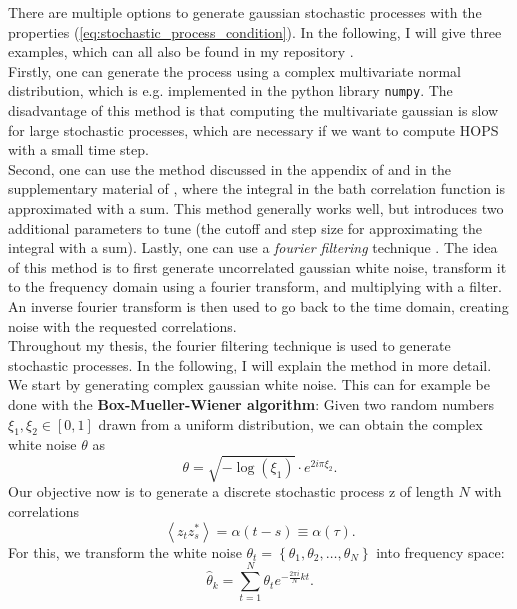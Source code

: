 There are multiple options to generate gaussian stochastic processes with the properties (\ref{eq:stochastic_process_condition}).
In the following, I will give three examples, which can all also be found in my repository \cite{Sappler:2023}. \\
Firstly, one can generate the process using a complex multivariate normal distribution, which is e.g. implemented in
the python library \verb|numpy|. The disadvantage of this method is that computing the multivariate gaussian is slow for
large stochastic processes, which are necessary if we want to compute HOPS with a small time step. \\
Second, one can use the method
discussed in the appendix of \cite{Song:2016} and in the supplementary material of \cite{Gao:2022}, where the integral in the
bath correlation function is approximated with a sum. This method generally works well, but introduces two additional parameters to tune 
(the cutoff and step size for approximating the integral with a sum). 
Lastly, one can use a \textit{fourier filtering} technique \cite{Ojalvo:1994}. The idea of this method is to first generate uncorrelated gaussian
white noise, transform it to the frequency domain using a fourier transform, and multiplying with a filter. An inverse fourier transform is
then used to go back to the time domain, creating noise with the requested correlations. \\
Throughout my thesis, the fourier filtering technique is used to generate stochastic processes. In the following, I will explain
the method in more detail. \\
We start by generating complex gaussian white noise. This can for example be done with the \textbf{Box-Mueller-Wiener algorithm}:
Given two random numbers $\xi_1, \xi_2 \in[0, 1]$ drawn from a uniform distribution, we can obtain the complex white noise $\theta$ as
\begin{equation*}
    \theta = \sqrt{-\log(\xi_1)} \cdot e^{2i\pi\xi_2}.
\end{equation*}
Our objective now is to generate a discrete stochastic process z of length $N$ with correlations
\begin{equation*}
    \left\langle z_t z^*_s\right\rangle = \alpha(t - s) \equiv \alpha(\tau).
\end{equation*}
For this, we transform the white noise $\theta_t = \left\{\theta_1, \theta_2, \dots, \theta_{N}\right\}$ into frequency space:
\begin{equation*}
    \hat{\theta}_k = \sum_{t=1}^{N} \theta_t e^{-\frac{2\pi i}{N}kt}.
\end{equation*}
